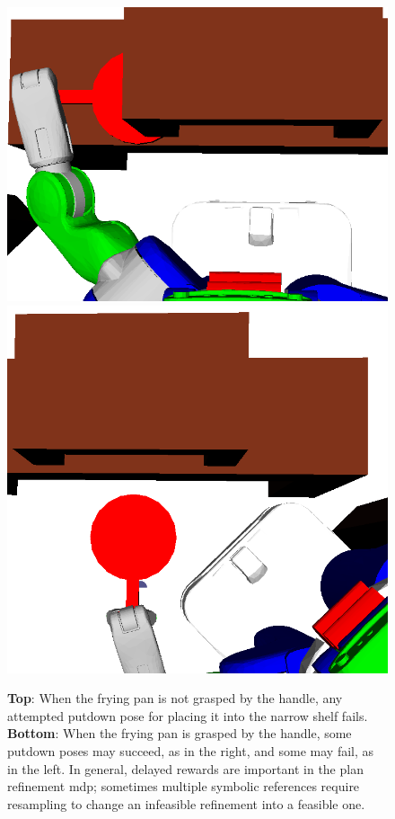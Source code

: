 \begin{figure}[t]
    \includegraphics[scale=0.16]{images/fry_good_grasp_bad_pd.png}\hspace{6mm}
    \includegraphics[scale=0.13]{images/fry_good_grasp_good_pd.png}
  \caption{\small{\textbf{Top}: When the frying pan is not grasped by the handle, any attempted putdown pose for
placing it into the narrow shelf fails. \textbf{Bottom}: When the frying pan is grasped by the handle, some putdown
poses may succeed, as in the right, and some may fail, as in the left. In general, delayed rewards
are important in the plan refinement {\sc mdp}; sometimes multiple symbolic references require resampling to
change an infeasible refinement into a feasible one.}}
  \label{fig:delayed}
\end{figure}

